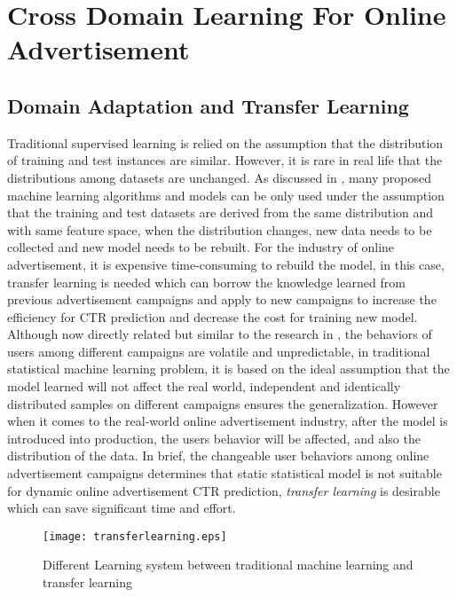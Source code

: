 \chapter{Cross Domain Learning For Online Advertisement}
\label{chapterlabel5}
\section{Domain Adaptation and Transfer Learning}
Traditional supervised learning is relied on the assumption that the distribution of training and test instances are similar. However, it is rare in real life that the distributions among datasets are unchanged. As discussed in \cite{facebook2015}, many proposed machine learning algorithms and models can be only used under the assumption that the training and test datasets are derived from the same distribution and with same feature space, when the distribution changes, new data needs to be collected and new model needs to be rebuilt. For the industry of online advertisement, it is expensive time-consuming to rebuild the model, in this case, transfer learning is needed which can borrow the knowledge learned from previous advertisement campaigns and apply to new campaigns to increase the efficiency for CTR prediction and decrease the cost for training new model. Although now directly related but similar to the research in \cite{pan2008transfer}, the behaviors of users among different campaigns are volatile and unpredictable, in traditional statistical machine learning problem, it is based on the ideal assumption that the model learned will not affect the real world, independent and identically distributed samples on different campaigns ensures the generalization. However when it comes to the real-world online advertisement industry, after the model is introduced into production, the users behavior will be affected, and also the distribution of the data. In brief, the changeable user behaviors among online advertisement campaigns determines that static statistical model is not suitable for dynamic online advertisement CTR prediction, \textit{transfer learning} is desirable which can save significant time and effort. 


\begin{figure}[t]
\centering
\texttt{[image: transferlearning.eps]}
\caption{Different Learning system between traditional machine learning and transfer learning}
\label{fig:transfer}
\end{figure}

